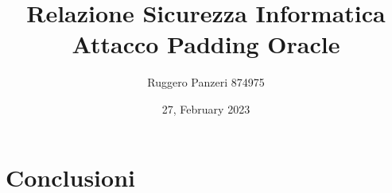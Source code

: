 \documentclass[a4paper, 12pt]{article}
\title{Relazione Sicurezza Informatica \\
    \large {Attacco Padding Oracle}}
\author{ \small Ruggero Panzeri 874975}
\date{\small 27, February 2023}
\begin{document}
\newcommand{\imagespace}{\vspace{0.4cm}}

\maketitle


\newpage

\tableofcontents

\newpage



\newpage
\section{Conclusioni}
        
\end{document}
